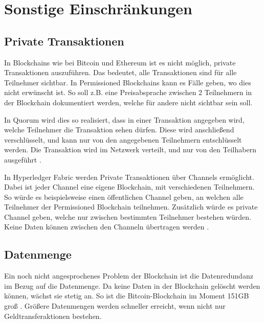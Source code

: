\section{Sonstige Einschränkungen}

\subsection{Private Transaktionen}
In Blockchains wie bei Bitcoin und Ethereum ist es nicht möglich, private Transaktionen auszuführen. Das bedeutet, alle Transaktionen sind für alle Teilnehmer sichtbar. In Permissioned Blockchains kann es Fälle geben, wo dies nicht erwünscht ist. So soll z.B. eine Preisabsprache zwischen 2 Teilnehmern in der Blockchain dokumentiert werden, welche für andere nicht sichtbar sein soll.

In Quorum wird dies so realisiert, dass in einer Transaktion angegeben wird, welche Teilnehmer die Transaktion sehen dürfen. Diese wird anschließend verschlüsselt, und kann nur von den angegebenen Teilnehmern entschlüsselt werden. Die Transaktion wird im Netzwerk verteilt, und nur von den Teilhabern ausgeführt \cite{QuorumTeamTransactionProcessingQuorum2018}.

In Hyperledger Fabric werden Private Transaktionen über Channels ermöglicht. Dabei ist jeder Channel eine eigene Blockchain, mit verschiedenen Teilnehmern. So würde es beispielsweise einen öffentlichen Channel geben, an welchen alle Teilnehmer der Permissioned Blockchain teilnehmen. Zusätzlich würde es private Channel geben, welche nur zwischen bestimmten Teilnehmer bestehen würden. Keine Daten können zwischen den Channeln übertragen werden \cite{SchererPerformanceScalabilityBlockchain2017}. 


\subsection{Datenmenge}
Ein noch nicht angesprochenes Problem der Blockchain ist die Datenredundanz im Bezug auf die Datenmenge. Da keine Daten in der Blockchain gelöscht werden können, wächst sie stetig an. So ist die Bitcoin-Blockchain im Moment 151GB groß \cite{BlockchainUnternehmenBlockchainSizeBitcoin}. Größere Datenmengen werden schneller erreicht, wenn nicht nur Geldtransferaktionen bestehen.

